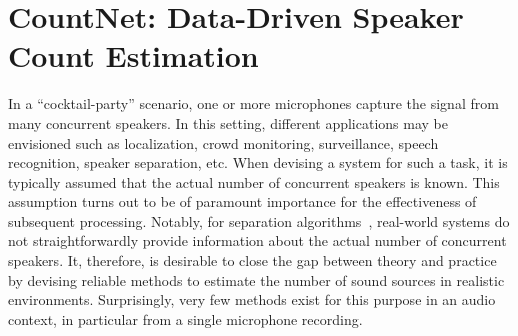 \chapter[Data-Driven Speaker Count Estimation]{CountNet: Data-Driven Speaker Count Estimation}
\label{cha:countnet}



In a ``cocktail-party'' scenario, one or more microphones capture the signal from many concurrent speakers. In this setting, different applications may be envisioned such as localization, crowd monitoring, surveillance, speech recognition, speaker separation, etc.
When devising a system for such a task, it is typically assumed that the actual number of concurrent speakers is known.
This assumption turns out to be of paramount importance for the effectiveness of subsequent processing.
Notably, for separation algorithms~\cite{common10},
real-world systems do not straightforwardly provide information about the actual number of concurrent speakers.
It, therefore, is desirable to close the gap between theory and practice by devising reliable methods to estimate the number of sound sources in realistic environments.
Surprisingly, very few methods exist for this purpose in an audio context, in particular from a single microphone recording.


